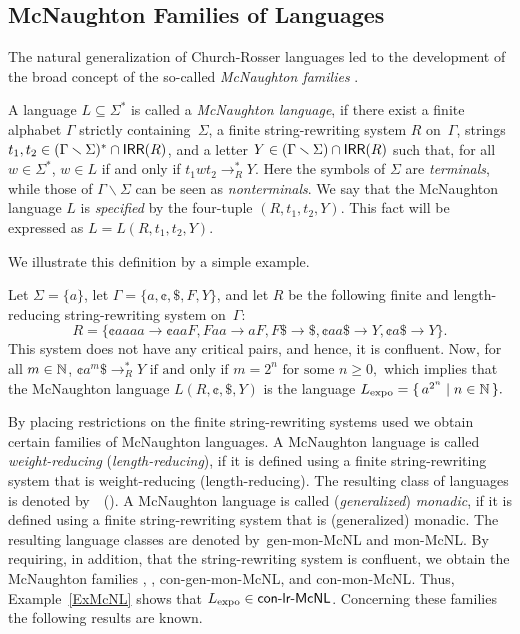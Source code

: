 \subsection{McNaughton Families of Languages}

The natural generalization of Church-Rosser languages led to the development of the broad concept of the so-called \emph{McNaughton families} \cite{Beaudry2003}.

A language $L\subseteq \Sigma^*$ is called a \emph{McNaughton language}, if there exist a finite alphabet $\Gamma$ strictly containing~$\Sigma$, a finite string-rewriting system $R$ on~$\Gamma$, strings $t_1,t_2\in(\Gamma\smallsetminus\Sigma)^*\cap \IRR(R)$, and a letter $Y\in(\Gamma\smallsetminus\Sigma)\cap \IRR(R)$ such that, for all $w\in\Sigma^*$, $w\in L$ if and only if $t_1wt_2\rightarrow^*_R Y$. Here the symbols of $\Sigma$ are \emph{terminals}, while those of $\Gamma\smallsetminus\Sigma$ can be seen as \emph{nonterminals}. We say that the McNaughton language $L$ is \emph{specified} by the four-tuple $(R,t_1,t_2,Y)$. This fact will be expressed as $L = L(R,t_1,t_2,Y)$.

We illustrate this definition by a simple example.

\begin{example}\label{ExMcNL}
Let $\Sigma=\{a\}$, let $\Gamma=\{a,\cent,\$,F,Y\}$, and let $R$ be the following finite and length-reducing string-rewriting system on~$\Gamma$: $$R=\{\cent aaaa\to \cent aaF, Faa\to aF, F\$\to \$, \cent aa\$ \to Y, \cent a\$\to Y\}.$$ This system does not have any critical pairs, and hence, it is confluent. Now, for all $m\in \mathbb{N}$, $\cent a^m\$\rightarrow_R^* Y\mbox{ if and only if } m=2^n\mbox{ for some }n\ge 0,$ which implies that the McNaughton language $L(R,\cent,\$,Y)$ is the language $L_{\rm expo} = \{\,a^{2^n}\mid n\in \mathbb{N}\,\}.$
\end{example}

By placing restrictions on the finite string-rewriting systems used we obtain certain families of McNaughton languages. A McNaughton language is called \emph{weight-reducing} (\emph{length-reducing}), if it is defined using a finite string-rewriting system that is weight-reducing (length-reducing). The resulting class of languages is denoted by~\wrMcNL\ (\lrMcNL). A McNaughton language is called (\emph{generalized}) \emph{monadic}, if it is defined using a finite string-rewriting system that is (generalized) monadic. The resulting language classes are denoted by~{\sf gen-mon-McNL} and {\sf mon-McNL}. By requiring, in addition, that the string-rewriting system is confluent, we obtain the McNaughton families \conwrMcNL, \conlrMcNL, {\sf con-gen-mon-McNL}, and {\sf con-mon-McNL}. Thus, Example~\ref{ExMcNL} shows that $L_{\rm expo}\in \mbox{\sf con-lr-McNL}$. Concerning these families the following results are known.

